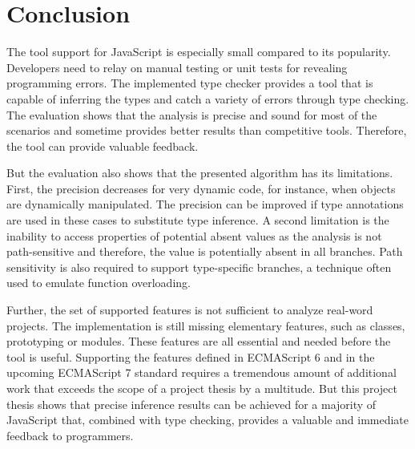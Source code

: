 \section{Conclusion}\label{sec:conclusion}
The tool support for JavaScript is especially small compared to its popularity. Developers need to relay on manual testing or unit tests for revealing programming errors. The implemented type checker provides a tool that is capable of inferring the types and catch a variety of errors through type checking. The evaluation shows that the analysis is precise and sound for most of the scenarios and sometime provides better results than competitive tools. Therefore, the tool can provide valuable feedback. 

But the evaluation also shows that the presented algorithm has its limitations. First, the precision decreases for very dynamic code, for instance, when objects are dynamically manipulated. The precision can be improved if type annotations are used in these cases to substitute type inference. A second limitation is the inability to access properties of potential absent values as the analysis is not path-sensitive and therefore, the value is potentially absent in all branches. Path sensitivity is also required to support type-specific branches, a technique often used to emulate function overloading. 

Further, the set of supported features is not sufficient to analyze real-word projects. The implementation is still missing elementary features, such as classes, prototyping or modules. These features are all essential and needed before the tool is useful. Supporting the features defined in ECMAScript 6 and in the upcoming ECMAScript 7 standard requires a tremendous amount of additional work that exceeds the scope of a project thesis by a multitude. But this project thesis shows that precise inference results can be achieved for a majority of JavaScript that, combined with type checking, provides a valuable and immediate feedback to programmers. 